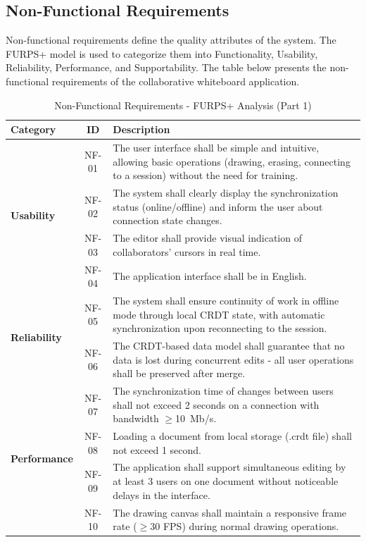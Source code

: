 \documentclass[a4paper,11pt,twoside]{report}
\theoremstyle{definition}
\begin{document}
\subsection{Non-Functional Requirements}

Non-functional requirements define the quality attributes of the system. The FURPS+ model is used to categorize them into Functionality, Usability, Reliability, Performance, and Supportability. The table below presents the non-functional requirements of the collaborative whiteboard application.

\begin{table}[H]
	\centering
	\caption{Non-Functional Requirements - FURPS+ Analysis (Part 1)}
	\begin{tabular}{|p{}|c|p{}|}
		\hline
		\textbf{Category} & \textbf{ID} & \textbf{Description} \\
		\hline
		\multirow{4}{*}{\parbox{0.18\textwidth}{\textbf{Usability}}}
		& NF-01 & The user interface shall be simple and intuitive, allowing basic operations (drawing, erasing, connecting to a session) without the need for training. \\
		\cline{2-3}
		& NF-02 & The system shall clearly display the synchronization status (online/offline) and inform the user about connection state changes. \\
		\cline{2-3}
		& NF-03 & The editor shall provide visual indication of collaborators' cursors in real time. \\
		\cline{2-3}
		& NF-04 & The application interface shall be in English. \\
		\hline
		\multirow{2}{*}{\parbox{0.18\textwidth}{\textbf{Reliability}}}
		& NF-05 & The system shall ensure continuity of work in offline mode through local CRDT state, with automatic synchronization upon reconnecting to the session. \\
		\cline{2-3}
		& NF-06 & The CRDT-based data model shall guarantee that no data is lost during concurrent edits - all user operations shall be preserved after merge. \\
		\hline
		\multirow{4}{*}{\parbox{0.18\textwidth}{\textbf{Performance}}}
		& NF-07 & The synchronization time of changes between users shall not exceed 2 seconds on a connection with bandwidth $\geq$10~Mb/s. \\
		\cline{2-3}
		& NF-08 & Loading a document from local storage (.crdt file) shall not exceed 1 second. \\
		\cline{2-3}
		& NF-09 & The application shall support simultaneous editing by at least 3 users on one document without noticeable delays in the interface. \\
		\cline{2-3}
		& NF-10 & The drawing canvas shall maintain a responsive frame rate ($\geq$30 FPS) during normal drawing operations. \\
		\hline
	\end{tabular}
	\label{tab:furps-analysis-1}
\end{table}
\end{document}

